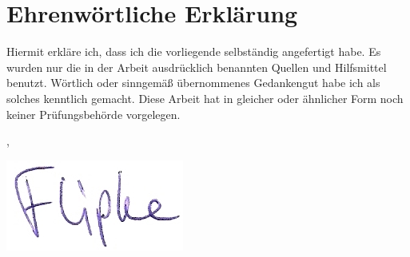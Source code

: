 
\section*{Ehrenwörtliche Erklärung}

Hiermit erkläre ich, dass ich die vorliegende \dokumententyp{} selbständig angefertigt habe. Es wurden nur die in der Arbeit ausdrücklich benannten Quellen und Hilfsmittel benutzt. Wörtlich oder sinngemäß übernommenes Gedankengut habe ich als solches kenntlich gemacht. Diese Arbeit hat in gleicher oder ähnlicher Form noch keiner Prüfungsbehörde vorgelegen.
\vspace{20mm}

\ort, \abgabedatum

\includegraphics[scale=1]{img/Unterschrift.jpg}

\vspace{-10mm}

\underline{\hspace{8cm}}\\\dokumentenautor